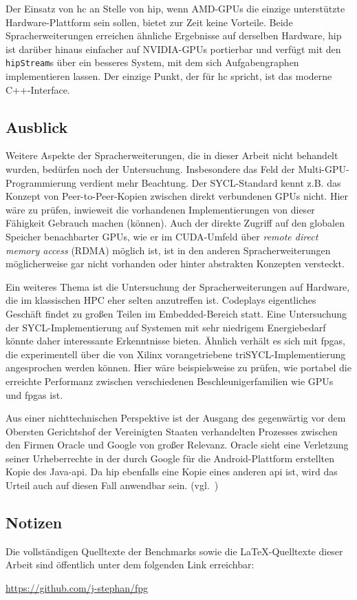 Der Einsatz von \gls{hc} an Stelle von \gls{hip}, wenn AMD-GPUs die einzige
unterstützte Hardware-Plattform sein sollen, bietet zur Zeit keine Vorteile.
Beide Spracherweiterungen erreichen ähnliche Ergebnisse auf derselben Hardware,
\gls{hip} ist darüber hinaus einfacher auf NVIDIA-GPUs portierbar und verfügt
mit den \texttt{hipStream}s über ein besseres System, mit dem sich
Aufgabengraphen implementieren lassen. Der einzige Punkt, der für \gls{hc}
spricht, ist das moderne C++-Interface.

\subsection{Ausblick}
\label{fazit:ausblick}

Weitere Aspekte der Spracherweiterungen, die in dieser Arbeit nicht behandelt
wurden, bedürfen noch der Untersuchung. Insbesondere das Feld der
Multi-GPU-Programmierung verdient mehr Beachtung. Der SYCL-Standard kennt z.B.
das Konzept von Peer-to-Peer-Kopien zwischen direkt verbundenen GPUs nicht. Hier
wäre zu prüfen, inwieweit die vorhandenen Implementierungen von dieser Fähigkeit
Gebrauch machen (können). Auch der direkte Zugriff auf den globalen Speicher
benachbarter GPUs, wie er im CUDA-Umfeld über
\textit{remote direct memory access} (RDMA) möglich ist, ist in den anderen
Spracherweiterungen möglicherweise gar nicht vorhanden oder hinter abstrakten
Konzepten versteckt.

Ein weiteres Thema ist die Untersuchung der Spracherweiterungen auf Hardware,
die im klassischen HPC eher selten anzutreffen ist. Codeplays eigentliches
Geschäft findet zu großen Teilen im Embedded-Bereich statt. Eine Untersuchung
der SYCL-Implementierung auf Systemen mit sehr niedrigem Energiebedarf könnte
daher interessante Erkenntnisse bieten. Ähnlich verhält es sich mit \gls{fpga}s,
die experimentell über die von Xilinx vorangetriebene triSYCL-Implementierung
angesprochen werden können. Hier wäre beispielsweise zu prüfen, wie portabel
die erreichte Performanz zwischen verschiedenen Beschleunigerfamilien wie
GPUs und \gls{fpga}s ist.

Aus einer nichttechnischen Perspektive ist der Ausgang des gegenwärtig vor
dem Obersten Gerichtshof der Vereinigten Staaten verhandelten Prozesses zwischen
den Firmen Oracle und Google von großer Relevanz. Oracle sieht eine Verletzung
seiner Urheberrechte in der durch Google für die Android-Plattform erstellten
Kopie des Java-\gls{api}. Da \gls{hip} ebenfalls eine Kopie eines anderen
\gls{api} ist, wird das Urteil auch auf diesen Fall anwendbar sein.
(vgl.~\cite{golem2019})

\subsection{Notizen}

Die vollständigen Quelltexte der Benchmarks sowie die \LaTeX-Quelltexte dieser
Arbeit sind öffentlich unter dem folgenden Link erreichbar:

\url{https://github.com/j-stephan/fpg}
